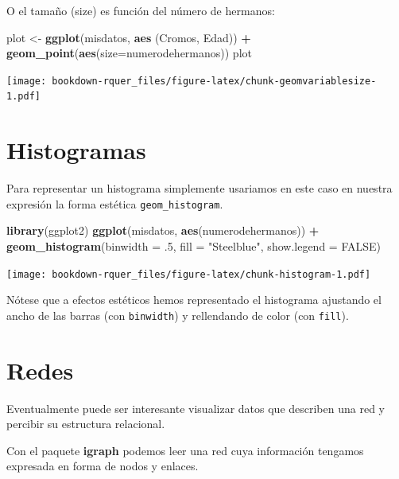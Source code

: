 \documentclass[]{book}
\newenvironment{Shaded}{\begin{snugshade}}{\end{snugshade}}
\newcommand{\DataTypeTok}[1]{\textcolor[rgb]{0.13,0.29,0.53}{#1}}
\newcommand{\FloatTok}[1]{\textcolor[rgb]{0.00,0.00,0.81}{#1}}
\newcommand{\KeywordTok}[1]{\textcolor[rgb]{0.13,0.29,0.53}{\textbf{#1}}}
\newcommand{\NormalTok}[1]{#1}
\newcommand{\OperatorTok}[1]{\textcolor[rgb]{0.81,0.36,0.00}{\textbf{#1}}}
\newcommand{\OtherTok}[1]{\textcolor[rgb]{0.56,0.35,0.01}{#1}}
\newcommand{\StringTok}[1]{\textcolor[rgb]{0.31,0.60,0.02}{#1}}
\theoremstyle{definition}
\theoremstyle{definition}
\theoremstyle{definition}
\theoremstyle{remark}
\begin{document}
O el tamaño (size) es función del número de hermanos:

\begin{Shaded}
\begin{Highlighting}[]
\NormalTok{plot <-}\StringTok{ }\KeywordTok{ggplot}\NormalTok{(misdatos, }\KeywordTok{aes}\NormalTok{ (Cromos, Edad)) }\OperatorTok{+}\StringTok{ }\KeywordTok{geom_point}\NormalTok{(}\KeywordTok{aes}\NormalTok{(}\DataTypeTok{size=}\NormalTok{numerodehermanos))}
\NormalTok{plot}
\end{Highlighting}
\end{Shaded}

\texttt{[image: bookdown-rquer\_files/figure-latex/chunk-geomvariablesize-1.pdf]}

\hypertarget{histogramas}{%
\section{Histogramas}\label{histogramas}}

Para representar un histograma simplemente usariamos en este caso en
nuestra expresión la forma estética \texttt{geom\_histogram}.

\begin{Shaded}
\begin{Highlighting}[]
\KeywordTok{library}\NormalTok{(ggplot2)}
\KeywordTok{ggplot}\NormalTok{(misdatos, }\KeywordTok{aes}\NormalTok{(numerodehermanos)) }\OperatorTok{+}
\StringTok{  }\KeywordTok{geom_histogram}\NormalTok{(}\DataTypeTok{binwidth =} \FloatTok{.5}\NormalTok{, }\DataTypeTok{fill =} \StringTok{"Steelblue"}\NormalTok{, }\DataTypeTok{show.legend =} \OtherTok{FALSE}\NormalTok{)}
\end{Highlighting}
\end{Shaded}

\texttt{[image: bookdown-rquer\_files/figure-latex/chunk-histogram-1.pdf]}

Nótese que a efectos estéticos hemos representado el histograma
ajustando el ancho de las barras (con \texttt{binwidth}) y rellendando
de color (con \texttt{fill}).

\hypertarget{redes}{%
\section{Redes}\label{redes}}

Eventualmente puede ser interesante visualizar datos que describen una
red y percibir su estructura relacional.

Con el paquete \textbf{igraph} \citep{R-igraph} podemos leer una red
cuya información tengamos expresada en forma de nodos y enlaces.
\end{document}
